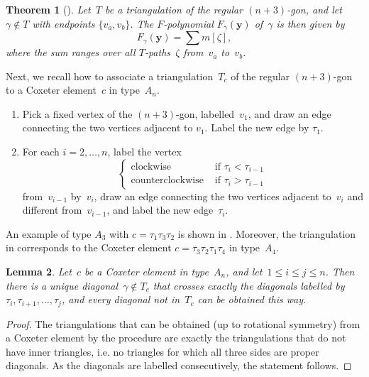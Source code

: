 \documentclass[10pt]{amsart}
\newtheorem{theo}{Theorem}[section]
\newtheorem{lemm}[theo]{Lemma}\newtheorem{prop}[theo]{Proposition}\newtheorem{coro}[theo]{Corollary}\newtheorem{conj}[theo]{Conjecture}
\theoremstyle{definition}\newtheorem{rema}[theo]{Remark}\newtheorem{exem}[theo]{Example}
\newcommand{\y}{\mathbf{y}}
\begin{document}
\begin{theo}[{\cite[Theorem~5.1]{MS2010}}]\label{thm:schiffler}
Let~$T$ be a triangulation of the regular $(n+3)$-gon, and let $\gamma \notin T$ with endpoints $\{v_a,v_b\}$. The $F$-polynomial $F_\gamma(\y)$ of~$\gamma$ is then given by
\[
F_\gamma(\y) = \sum m[\zeta],
\]
where the sum ranges over all $T$-paths~$\zeta$ from~$v_a$ to~$v_b$.
\end{theo}

Next, we recall how to associate a triangulation~$T_c$ of the regular $(n+3)$-gon to a Coxeter element~$c$ in type~$A_n$.
\begin{enumerate}
\item Pick a fixed vertex of the $(n+3)$-gon, labelled~$v_1$, and draw an edge connecting the two vertices adjacent to $v_1$. Label the new edge by $\tau_1$.
\item For each $i = 2,\dots,n$, label the vertex
\[
\begin{cases}
\text{clockwise} & \text{ if } \tau_i < \tau_{i-1} \\
\text{counterclockwise} & \text{ if } \tau_i > \tau_{i-1}
\end{cases}
\]
from~$v_{i-1}$ by~$v_i$, draw an edge connecting the two vertices adjacent to~$v_i$ and different from~$v_{i-1}$, and label the new edge~$\tau_i$.
\end{enumerate}

An example of type $A_3$ with $c = \tau_1\tau_3\tau_2$ is shown in . Moreover, the triangulation in  corresponds to the Coxeter element $c = \tau_3\tau_2\tau_1\tau_4$ in type~$A_4$.

\begin{lemm}\label{lem:diagonalspositiveroots}
Let~$c$ be a Coxeter element in type~$A_n$, and let~$1 \leq i \leq j \leq n$. Then there is a unique diagonal~$\gamma \notin T_c$ that crosses exactly the diagonals labelled by $\tau_i,\tau_{i+1},\dots,\tau_j$, and every diagonal not in~$T_c$ can be obtained this way.
\end{lemm}

\begin{proof}
The triangulations that can be obtained (up to rotational symmetry) from a Coxeter element by the procedure are exactly the triangulations that do not have inner triangles, i.e. no triangles for which all three sides are proper diagonals. As the diagonals are labelled consecutively, the statement follows.
\end{proof}
\end{document}
